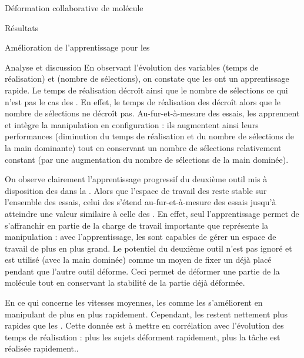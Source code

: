 \documentclass[myfrancais,ngerman,english,french]{mythesis}
\begin{document}
\begin{mychapter}{Déformation collaborative de molécule}
\begin{mysection}{Résultats}
\begin{mysubsection}{Amélioration de l'apprentissage pour les }
\begin{mysubsubsection}{Analyse et discussion}
					En observant l'évolution des variables  (temps de réalisation) et  (nombre de sélections), on constate que les  ont un apprentissage rapide.
					Le temps de réalisation décroît ainsi que le nombre de sélections ce qui n'est pas le cas des .
					En effet, le temps de réalisation des  décroît alors que le nombre de sélections ne décroît pas.
					Au-fur-et-à-mesure des essais, les  apprennent et intègre la manipulation en configuration  : ils augmentent ainsi leurs performances (diminution du temps de réalisation et du nombre de sélections de la main dominante) tout en conservant un nombre de sélections relativement constant (par une augmentation du nombre de sélections de la main dominée).

					On observe clairement l'apprentissage progressif du deuxième outil mis à disposition des  dans la .
					Alors que l'espace de travail des  reste stable sur l'ensemble des essais, celui des  s'étend au-fur-et-à-mesure des essais jusqu'à atteindre une valeur similaire à celle des .
					En effet, seul l'apprentissage permet de s'affranchir en partie de la charge de travail importante que représente la manipulation   : avec l'apprentissage, les  sont capables de gérer un espace de travail de plus en plus grand.
					Le potentiel du deuxième outil n'est pas ignoré et est utilisé (avec la main dominée) comme un moyen de fixer un  déjà placé pendant que l'autre outil déforme.
					Ceci permet de déformer une partie de la molécule tout en conservant la stabilité de la partie déjà déformée.

					En ce qui concerne les vitesses moyennes, les  comme les  s'améliorent en manipulant de plus en plus rapidement.
					Cependant, les  restent nettement plus rapides que les .
					Cette donnée est à mettre en corrélation avec l'évolution des temps de réalisation : plus les sujets déforment rapidement, plus la tâche est réalisée rapidement..


\end{mysubsubsection}
\end{mysubsection}
\end{mysection}
\end{mychapter}
\end{document}
